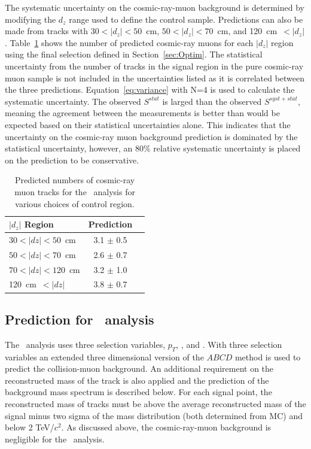 The systematic uncertainty on the cosmic-ray-muon background is determined by
modifying the $d_z$ range used to define the control sample.  Predictions
can also be made from tracks with $30 < |d_z| < 50$~cm, $50 < |d_z| < 70$~cm, and
120~cm~$< |d_z|$.  Table~\ref{tab:CosmicPred} shows the number of predicted cosmic-ray muons
for each $|d_z|$ region using the final selection defined in Section~\ref{sec:Optim}.
The statistical uncertainty from the number of tracks in the signal region in the
pure cosmic-ray muon sample is not included in the uncertainties listed as it is correlated
between the three predictions.
Equation~\ref{eq:variance} with N=4 is used to calculate the systematic uncertainty.
The observed $S^{stat}$ is larged than the observed $S^{syst+stat}$, meaning the agreement between the measurements is better than
would be expected based on their statistical uncertainties alone.
This indicates that the uncertainty on the cosmic-ray muon background prediction is dominated by the statistical uncertainty, however, an 80\% relative systematic uncertainty 
is placed on the prediction to be conservative.

\begin{table}
 \begin{center}
  \caption{Predicted numbers of cosmic-ray muon tracks for the \muononly\ analysis for various choices of control region.}
     \label{tab:CosmicPred}
  \begin{tabular}{|l|c|c|} \hline
   $|d_z|$ Region            & Prediction  \\ \hline
   $30 < |dz| < 50$~cm  & 3.1 $\pm$ 0.5   \\ \hline
   $50 < |dz| < 70$~cm  & 2.6 $\pm$ 0.7   \\ \hline
   $70 < |dz| < 120$~cm & 3.2 $\pm$ 1.0   \\ \hline
   120~cm~$< |dz|$      & 3.8 $\pm$ 0.7   \\ \hline
  \end{tabular}
 \end{center}
\end{table}

\subsection{Prediction for \tktof\ analysis}

The \tktof\ analysis uses three selection variables, $p_T$, \invbeta, and \ias. With three selection variables an extended three dimensional version of the 
$ABCD$ method is used to predict the collision-muon background. An additional requirement on the reconstructed mass of the track
is also applied and the prediction of the background mass spectrum is described below. 
For each signal point, the reconstructed mass of tracks must be above the average reconstructed mass of the signal minus two sigma of the mass
distribution (both determined from MC) and below 2 TeV/$c^2$.
As discussed above, the cosmic-ray-muon background is negligible
for the \tktof\ analysis. 

